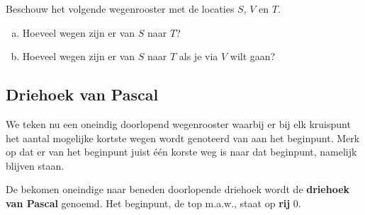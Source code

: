 \documentclass[12pt,a4,twoside]{article}
\makeatletter
\newcommand\binomialCoefficient[2]{%
    \c@pgf@counta=#1%
    \c@pgf@countb=#2%
    \c@pgf@countc=\c@pgf@counta%
    \advance\c@pgf@countc by-\c@pgf@countb%
    \ifnum\c@pgf@countb>\c@pgf@countc%
        \c@pgf@countb=\c@pgf@countc%
    \fi%
    \c@pgf@countc=1%
    \c@pgf@countd=0%
    \pgfmathloop%
        \ifnum\c@pgf@countd<\c@pgf@countb%
        \multiply\c@pgf@countc by\c@pgf@counta%
        \advance\c@pgf@counta by-1%
        \advance\c@pgf@countd by1%
        \divide\c@pgf@countc by\c@pgf@countd%
    \repeatpgfmathloop%
    \the\c@pgf@countc%
}
\makeatother
\begin{document}
\begin{oefening}
Beschouw het volgende wegenrooster met de locaties $S$, $V$ en $T$.
\begin{center}
\end{center}
\begin{enumerate}[(a)]
\item Hoeveel wegen zijn er van $S$ naar $T$?
\item Hoeveel wegen zijn er van $S$ naar $T$ als je via $V$ wilt gaan?
\end{enumerate}
\end{oefening}

\pagebreak
\subsection{Driehoek van Pascal}

We teken nu een oneindig doorlopend wegenrooster waarbij er bij elk kruispunt het aantal mogelijke kortste wegen wordt genoteerd van aan het beginpunt. Merk op dat er van het beginpunt juist één korste weg is naar dat beginpunt, namelijk blijven staan.

\vspace*{1cm}
\begin{center}
\end{center}
\vspace*{1cm}

\begin{mdframed}
De bekomen oneindige naar beneden doorlopende driehoek wordt de {\bf driehoek van Pascal} genoemd. Het beginpunt, de top m.a.w., staat op {\bf rij} 0.
\end{mdframed}
\end{document}
